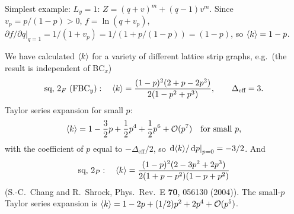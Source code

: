 \begin{diagram}
\end{diagram}

Simplest example: $L_y = 1$: $Z = (q+v)^m + (q-1)v^m$. Since $v_p = p/(1-p)>0$, $f = \ln(q+v_p)$,
$\left.\partial f/\partial q\right|_{q=1} = 1/(1+v_p) = 1/(1+p/(1-p)) = (1-p)$, so $\langle k\rangle = 1-p$.

We have calculated $\langle k\rangle$ for a variety of different lattice strip graphs, e.g.\ (the result is independent of BC$_x$)
\begin{equation}
  \text{sq, }2_F\ (\text{FBC}_y):\quad \langle k\rangle = \frac{(1-p)^2(2+p-2p^2)}{2(1-p^2+p^3)},\qquad\Delta_{\text{eff}} = 3 .
\end{equation}
Taylor series expansion for small $p$:
\begin{equation}
  \langle k\rangle = 1-\frac{3}{2}p+\frac{1}{2}p^4+\frac{1}{2}p^6+\mathcal{O}(p^7)\quad\text{for small }p,
\end{equation}
with the coefficient of $p$ equal to $-\Delta_{\text{eff}}/2$, so $\left.\mathop{}\!\mathrm{d}\langle k\rangle/\mathop{}\!\mathrm{d} p\right|_{p=0} = -3/2$. And
\begin{equation}
  \text{sq, }2_P:\quad \langle k\rangle = \frac{(1-p)^2(2-3p^2+2p^3)}{2(1+p-p^2)(1-p+p^2)}
\end{equation}
(S.-C.~Chang and R.~Shrock, Phys.\ Rev.\ E \textbf{70}, 056130 (2004)). The small-$p$ Taylor series expansion is
$\langle k\rangle = 1-2p+(1/2)p^2+2p^4+\mathcal{O}(p^5)$.


